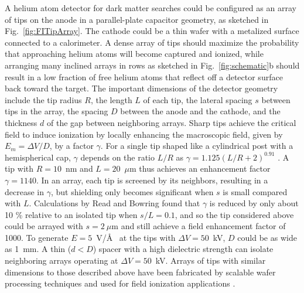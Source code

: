 \documentclass[10pt, letterpaper, reprint, superscriptaddress, aps, prl]
{revtex4-1} \usepackage[latin1]{inputenc}
\begin{document}
A helium atom detector for dark matter searches could be configured as an array of tips on the anode in a parallel-plate capacitor geometry, as sketched in Fig.~\ref{fig:FITipArray}. 
The cathode could be a thin wafer with a metalized surface connected to a calorimeter. 
A dense array of tips should maximize the probability that approaching helium atoms will become captured and ionized, while arranging many inclined arrays in rows as sketched in Fig.~\ref{fig:schematic}b should result in a low fraction of free helium atoms that reflect off a detector surface back toward the target.  
The important dimensions of the detector geometry include the tip radius $R$, the length $L$ of each tip, the lateral spacing $s$ between tips in the array, the spacing $D$ between the anode and the cathode, and the thickness $d$ of the gap between neighboring arrays. 
Sharp tips achieve the critical field to induce ionization by locally enhancing the macroscopic field, given by $E_m=\Delta V/D$, by a factor $\gamma$. 
For a single tip shaped like a cylindrical post with a hemispherical cap, $\gamma$ depends on the ratio $L/R$ as $\gamma=1.125(L/R+2)^{0.91}$ \cite{Edgcombe2001}. 
A tip with $R=10$~nm and $L=20$~$\mu$m thus achieves an enhancement factor $\gamma = 1140$. 
In an array, each tip is screened by its neighbors, resulting in a decrease in $\gamma$, but shielding only becomes significant when $s$ is small compared with $L$. 
Calculations by Read and Bowring \cite{Read2004} found that $\gamma$ is reduced by only about 10 \% relative to an isolated tip when $s/L=0.1$, and so the tip considered above could be arrayed with $s=2 ~\mu$m and still achieve a field enhancement factor of 1000. 
To generate  $E=5$~V/\AA~ at the tips with $\Delta V=50$~kV, $D$ could be as wide as 1~mm. 
A thin ($d<D$) spacer with a high dielectric strength can isolate neighboring arrays operating at $\Delta V=50$~kV.
Arrays of tips with similar dimensions to those described above have been fabricated by scalable wafer processing techniques and used for field ionization applications \cite{Johnson2012}.
\end{document}
